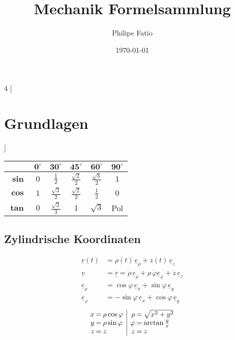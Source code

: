 \documentclass{article}
\author{Philipe Fatio}
\title{Mechanik Formelsammlung}
\date{\today}
\begin{document}
	\footnotesize
	\begin{multicols*}{4}
		[\section{Grundlagen}] %
			\begin{tabular}{r|ccccc}
			 	& $\mathbf{0^{\circ}}$ & $\mathbf{30^{\circ}}$ & $\mathbf{45^{\circ}}$ & $\mathbf{60^{\circ}}$ & $\mathbf{90^{\circ}}$\\
				\hline
				$\boldsymbol{\sin}$ & $0$ & $\frac{1}{2}$ & $\frac{\sqrt{2}}{2}$ & $\frac{\sqrt{3}}{2}$ & $1$\\
				$\boldsymbol{\cos}$ & $1$ & $\frac{\sqrt{3}}{2}$ & $\frac{\sqrt{2}}{2}$ & $\frac{1}{2}$ & $0$\\
				$\boldsymbol{\tan}$ & $0$ & $\frac{\sqrt{3}}{3}$ & $1$ & $\sqrt{3}$ & Pol\\
			\end{tabular}
			\subsection{Zylindrische Koordinaten} %
				\begin{align*}
					\underline{r}(t) &= \rho(t) \, \underline{e}_{\rho} + z(t) \, \underline{e}_z \\
					\underline{v} &= \dot{\underline{r}} = \dot{\rho} \, \underline{e}_{\rho} + \rho \, \dot{\varphi} \underline{e}_{\varphi} + \dot{z} \, \underline{e}_z \\
					\underline{e}_{\rho} &= \cos{\varphi} \, \underline{e}_x + \sin{\varphi} \, \underline{e}_y \\
					\underline{e}_{\varphi} &= - \sin{\varphi} \, \underline{e}_x + \cos{\varphi} \, \underline{e}_y
				\end{align*}
				\[
					\begin{array}{r@{\:=\:}l|r@{\:=\:}l}
						x & \rho \cos{\varphi} & \rho & \sqrt{x^2 + y^2} \\
						y & \rho \sin{\varphi} & \varphi & \arctan{\frac{y}{x}} \\
						z & z & z & z
					\end{array}
				\]

\end{multicols*}
\end{document}
